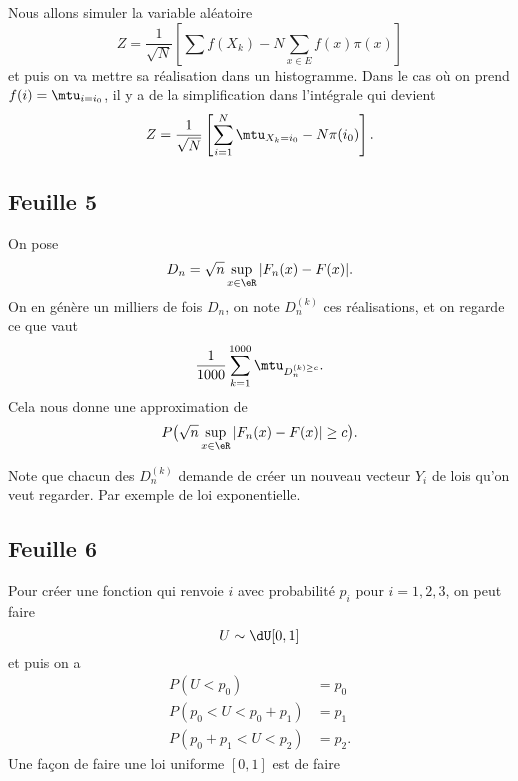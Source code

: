 Nous allons simuler la variable aléatoire
\begin{equation}
    Z=\frac{1}{ \sqrt{N} }\left[ \sum f(X_k)-N\sum_{x\in E} f(x)\pi(x) \right]
\end{equation}
et puis on va mettre sa réalisation dans un histogramme. Dans le cas où on prend \( f(i)=\mtu_{i=i_0}\), il y a de la simplification dans l'intégrale qui devient 
\begin{equation}
    Z=\frac{1}{ \sqrt{N} }\left[ \sum_{i=1}^N\mtu_{X_k=i_0}-N\pi(i_0) \right].
\end{equation}

\subsection{Feuille 5}

On pose 
\begin{equation}
    D_n=\sqrt{n}\sup_{x\in\eR}| F_n(x)-F(x) |.
\end{equation}
On en génère un milliers de fois \( D_n\), on note \( D_n^{(k)}\) ces réalisations, et on regarde ce que vaut
\begin{equation}
    \frac{1}{ 1000 }\sum_{k=1}^{1000}\mtu_{D_n^{(k)\geq c}}.
\end{equation}
Cela nous donne une approximation de
\begin{equation}
    P\big( \sqrt{n}\sup_{x\in\eR}| F_n(x)-F(x) |\geq c \big).
\end{equation}

Note que chacun des \( D_n^{(k)}\) demande de créer un nouveau vecteur \( Y_i\) de lois qu'on veut regarder. Par exemple de loi exponentielle.

\subsection{Feuille 6}

Pour créer une fonction qui renvoie \( i\) avec probabilité \( p_i\) pour \( i=1,2,3\), on peut faire
\begin{equation}
    U\sim\dU[0,1]
\end{equation}
et puis on a
\begin{subequations}
    \begin{align}
        P(U<p_0)&=p_0\\
        P(p_0<U<p_0+p_1)&=p_1\\
        P(p_0+p_1<U<p_2)&=p_2.
    \end{align}
\end{subequations}
Une façon de faire une loi uniforme \( [0,1]\) est de faire 

